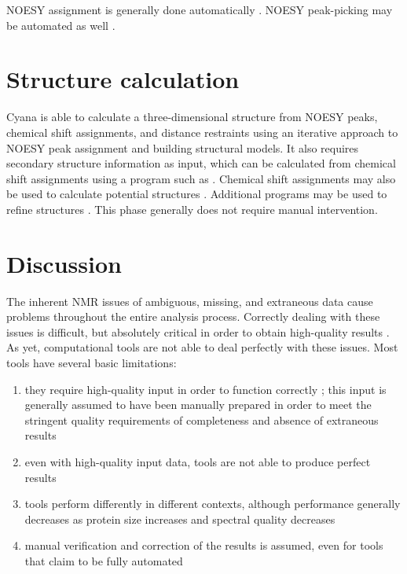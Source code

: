 NOESY assignment is generally done automatically \cite{cyana2004, aria2003}.  
NOESY peak-picking may be automated as well \cite{munin, korzhnev2001munin}.


\section{Structure calculation}

Cyana is able to calculate a three-dimensional structure from NOESY peaks, 
chemical shift assignments, and distance restraints \cite{cyana2004, aria2003} 
using an iterative approach to NOESY peak assignment and building structural 
models.  It also requires secondary structure information as input, which can 
be calculated from chemical shift assignments using a program such as 
\cite{talos+}.  Chemical shift assignments may also be used to 
calculate potential structures \cite{cs-rosetta}.  Additional programs 
may be used to refine structures \cite{amber, xplor-nih}.  This phase 
generally does not require manual intervention.


\section{Discussion}

The inherent NMR issues of ambiguous, missing, and extraneous data cause 
problems throughout the entire analysis process.  Correctly dealing with 
these issues is difficult, but absolutely critical in order to obtain 
high-quality results \cite{williamson2009automated, guntert2009automated, 
altieri2004automation, baran2004automated}.  As yet, computational tools 
are not able to deal perfectly with these issues.  
Most tools have several basic limitations: 
\begin{enumerate}
  \item they require high-quality input in order to function correctly 
  \cite{saga, abacus_assignment, mars, autoassign2001, ezassign, pine, cyana2004}; 
  this input is generally assumed to have been manually prepared in order 
  to meet the stringent quality requirements of completeness and absence of 
  extraneous results
  \item even with high-quality input data, tools are not able to produce 
  perfect results 
  \item tools perform differently in different contexts, although 
  performance generally decreases as protein size increases and spectral quality 
  decreases
  \item manual verification and correction of the results is assumed, 
  even for tools that claim to be fully automated 
  \cite{williamson2009automated, guntert2009automated, altieri2004automation,
  baran2004automated}
\end{enumerate}

